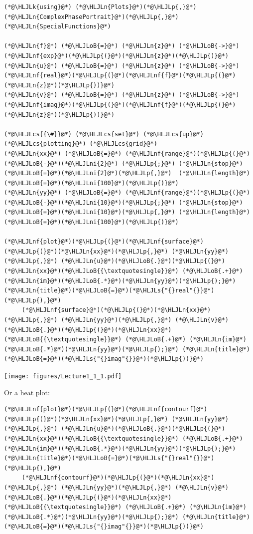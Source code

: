 \documentclass[12pt,a4paper]{article}
\newcommand{\HLJLk}[1]{\textcolor[RGB]{148,91,176}{\textbf{#1}}}
\newcommand{\HLJLn}[1]{#1}
\newcommand{\HLJLnf}[1]{\textcolor[RGB]{66,102,213}{#1}}
\newcommand{\HLJLs}[1]{\textcolor[RGB]{201,61,57}{#1}}
\newcommand{\HLJLni}[1]{\textcolor[RGB]{59,151,46}{#1}}
\newcommand{\HLJLoB}[1]{\textcolor[RGB]{102,102,102}{\textbf{#1}}}
\newcommand{\HLJLp}[1]{#1}
\newcommand{\HLJLcs}[1]{\textcolor[RGB]{153,153,119}{\textit{#1}}}
\begin{document}
\begin{lstlisting}
(*@\HLJLk{using}@*) (*@\HLJLn{Plots}@*)(*@\HLJLp{,}@*) (*@\HLJLn{ComplexPhasePortrait}@*)(*@\HLJLp{,}@*) (*@\HLJLn{SpecialFunctions}@*)

(*@\HLJLn{f}@*) (*@\HLJLoB{=}@*) (*@\HLJLn{z}@*) (*@\HLJLoB{->}@*) (*@\HLJLnf{exp}@*)(*@\HLJLp{(}@*)(*@\HLJLn{z}@*)(*@\HLJLp{)}@*)
(*@\HLJLn{u}@*) (*@\HLJLoB{=}@*) (*@\HLJLn{z}@*) (*@\HLJLoB{->}@*) (*@\HLJLnf{real}@*)(*@\HLJLp{(}@*)(*@\HLJLnf{f}@*)(*@\HLJLp{(}@*)(*@\HLJLn{z}@*)(*@\HLJLp{))}@*)
(*@\HLJLn{v}@*) (*@\HLJLoB{=}@*) (*@\HLJLn{z}@*) (*@\HLJLoB{->}@*) (*@\HLJLnf{imag}@*)(*@\HLJLp{(}@*)(*@\HLJLnf{f}@*)(*@\HLJLp{(}@*)(*@\HLJLn{z}@*)(*@\HLJLp{))}@*)

(*@\HLJLcs{{\#}}@*) (*@\HLJLcs{set}@*) (*@\HLJLcs{up}@*) (*@\HLJLcs{plotting}@*) (*@\HLJLcs{grid}@*)
(*@\HLJLn{xx}@*) (*@\HLJLoB{=}@*) (*@\HLJLnf{range}@*)(*@\HLJLp{(}@*)(*@\HLJLoB{-}@*)(*@\HLJLni{2}@*) (*@\HLJLp{;}@*) (*@\HLJLn{stop}@*)(*@\HLJLoB{=}@*)(*@\HLJLni{2}@*)(*@\HLJLp{,}@*)  (*@\HLJLn{length}@*)(*@\HLJLoB{=}@*)(*@\HLJLni{100}@*)(*@\HLJLp{)}@*)
(*@\HLJLn{yy}@*) (*@\HLJLoB{=}@*) (*@\HLJLnf{range}@*)(*@\HLJLp{(}@*)(*@\HLJLoB{-}@*)(*@\HLJLni{10}@*)(*@\HLJLp{;}@*) (*@\HLJLn{stop}@*)(*@\HLJLoB{=}@*)(*@\HLJLni{10}@*)(*@\HLJLp{,}@*) (*@\HLJLn{length}@*)(*@\HLJLoB{=}@*)(*@\HLJLni{100}@*)(*@\HLJLp{)}@*)

(*@\HLJLnf{plot}@*)(*@\HLJLp{(}@*)(*@\HLJLnf{surface}@*)(*@\HLJLp{(}@*)(*@\HLJLn{xx}@*)(*@\HLJLp{,}@*) (*@\HLJLn{yy}@*)(*@\HLJLp{,}@*) (*@\HLJLn{u}@*)(*@\HLJLoB{.}@*)(*@\HLJLp{(}@*)(*@\HLJLn{xx}@*)(*@\HLJLoB{{\textquotesingle}}@*) (*@\HLJLoB{.+}@*) (*@\HLJLn{im}@*)(*@\HLJLoB{.*}@*)(*@\HLJLn{yy}@*)(*@\HLJLp{);}@*) (*@\HLJLn{title}@*)(*@\HLJLoB{=}@*)(*@\HLJLs{"{}real"{}}@*)(*@\HLJLp{),}@*)
     (*@\HLJLnf{surface}@*)(*@\HLJLp{(}@*)(*@\HLJLn{xx}@*)(*@\HLJLp{,}@*) (*@\HLJLn{yy}@*)(*@\HLJLp{,}@*) (*@\HLJLn{v}@*)(*@\HLJLoB{.}@*)(*@\HLJLp{(}@*)(*@\HLJLn{xx}@*)(*@\HLJLoB{{\textquotesingle}}@*) (*@\HLJLoB{.+}@*) (*@\HLJLn{im}@*)(*@\HLJLoB{.*}@*)(*@\HLJLn{yy}@*)(*@\HLJLp{);}@*) (*@\HLJLn{title}@*)(*@\HLJLoB{=}@*)(*@\HLJLs{"{}imag"{}}@*)(*@\HLJLp{))}@*)
\end{lstlisting}

\texttt{[image: figures/Lecture1\_1\_1.pdf]}

Or a heat plot:


\begin{lstlisting}
(*@\HLJLnf{plot}@*)(*@\HLJLp{(}@*)(*@\HLJLnf{contourf}@*)(*@\HLJLp{(}@*)(*@\HLJLn{xx}@*)(*@\HLJLp{,}@*) (*@\HLJLn{yy}@*)(*@\HLJLp{,}@*) (*@\HLJLn{u}@*)(*@\HLJLoB{.}@*)(*@\HLJLp{(}@*)(*@\HLJLn{xx}@*)(*@\HLJLoB{{\textquotesingle}}@*) (*@\HLJLoB{.+}@*) (*@\HLJLn{im}@*)(*@\HLJLoB{.*}@*)(*@\HLJLn{yy}@*)(*@\HLJLp{);}@*) (*@\HLJLn{title}@*)(*@\HLJLoB{=}@*)(*@\HLJLs{"{}real"{}}@*)(*@\HLJLp{),}@*)
     (*@\HLJLnf{contourf}@*)(*@\HLJLp{(}@*)(*@\HLJLn{xx}@*)(*@\HLJLp{,}@*) (*@\HLJLn{yy}@*)(*@\HLJLp{,}@*) (*@\HLJLn{v}@*)(*@\HLJLoB{.}@*)(*@\HLJLp{(}@*)(*@\HLJLn{xx}@*)(*@\HLJLoB{{\textquotesingle}}@*) (*@\HLJLoB{.+}@*) (*@\HLJLn{im}@*)(*@\HLJLoB{.*}@*)(*@\HLJLn{yy}@*)(*@\HLJLp{);}@*) (*@\HLJLn{title}@*)(*@\HLJLoB{=}@*)(*@\HLJLs{"{}imag"{}}@*)(*@\HLJLp{))}@*)
\end{lstlisting}
\end{document}

